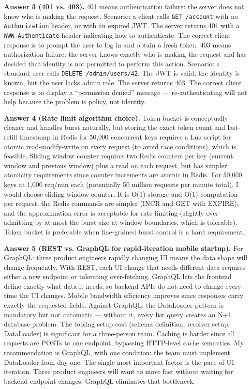 \documentclass[11pt,a4paper]{article}
\begin{document}
\begin{answerbox}
\vspace{8pt}
\textbf{Answer 3 (401 vs. 403).} 401 means authentication failure: the server does not know who is making the request. Scenario: a client calls \texttt{GET /account} with no \texttt{Authorization} header, or with an expired JWT. The server returns 401 with a \texttt{WWW-Authenticate} header indicating how to authenticate. The correct client response is to prompt the user to log in and obtain a fresh token. 403 means authorization failure: the server knows exactly who is making the request and has decided that identity is not permitted to perform this action. Scenario: a standard user calls \texttt{DELETE /admin/users/42}. The JWT is valid, the identity is known, but the user lacks admin role. The server returns 403. The correct client response is to display a ``permission denied'' message --- re-authenticating will not help because the problem is policy, not identity.

\vspace{8pt}
\textbf{Answer 4 (Rate limit algorithm choice).} Token bucket is conceptually cleaner and handles burst naturally, but storing the exact token count and last-refill timestamp in Redis for 50,000 concurrent keys requires a Lua script for atomic read-modify-write on every request (to avoid race conditions), which is feasible. Sliding window counter requires two Redis counters per key (current window and previous window) plus a read on each request, but has simpler atomicity requirements since counter increments are atomic in Redis. For 50,000 keys at 1,000 req/min each (potentially 50 million requests per minute total), I would choose sliding window counter. It is O(1) storage and O(1) computation per request, the Redis commands are simpler (INCR and GET with EXPIRE), and the approximation error is acceptable for rate limiting (slightly over-admitting by at most the burst size at window boundaries, which is tolerable). Token bucket is preferable when fine-grained burst control is a hard requirement.

\vspace{8pt}
\textbf{Answer 5 (REST vs. GraphQL for rapid-iteration mobile startup).} For GraphQL: three product engineers rapidly changing UI means the data shape will change frequently. With REST, each UI change that needs different data requires either a new endpoint or tolerating over-fetching. GraphQL lets the frontend define exactly what data it needs, so backend APIs do not need to change every time the UI changes. Mobile bandwidth efficiency improves since responses carry exactly the requested fields. Against GraphQL: the DataLoader pattern is mandatory but not automatic --- without it, every list query creates an N+1 database problem. The tooling setup cost (schema definition, resolver setup, DataLoader) is significant for a three-person team. Caching is harder since all requests are POSTs to one endpoint, bypassing HTTP-level cache semantics. My recommendation is GraphQL, with one condition: the team must implement DataLoader from day one. The single most important factor is the pace of UI iteration. Three product engineers will want to move fast without waiting for backend endpoint changes. GraphQL eliminates that bottleneck.
\end{answerbox}
\end{document}
